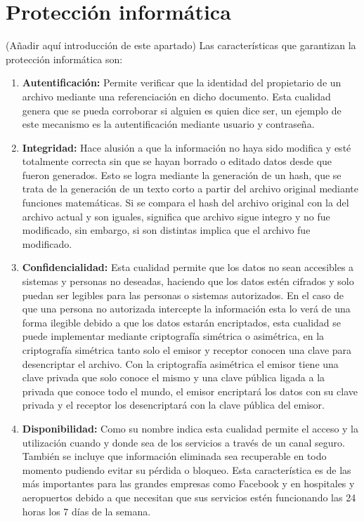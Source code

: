 \chapter{Protección informática}
\label{cha:proteccion-informatica}
(Añadir aquí introducción de este apartado)
Las características que garantizan la protección informática son:
\begin{enumerate}
\item {\bfseries Autentificación:}
Permite verificar que la identidad del propietario de un archivo mediante una referenciación en dicho documento. Esta cualidad genera que se pueda corroborar si alguien es quien dice ser, un ejemplo de este mecanismo es la autentificación mediante usuario y contraseña.
\item {\bfseries Integridad:}
Hace alusión a que la información no haya sido modifica y esté totalmente correcta sin que se hayan borrado o editado datos desde que fueron generados. Esto se logra mediante la generación de un hash, que se trata de la generación de un texto corto a partir del archivo original mediante funciones matemáticas. Si se compara el hash del archivo original con la del archivo actual y son iguales, significa que archivo sigue integro y no fue modificado, sin embargo, si son distintas implica que el archivo fue modificado.
\item {\bfseries Confidencialidad:}
Esta cualidad permite que los datos no sean accesibles a sistemas y personas no deseadas, haciendo que los datos estén cifrados y solo puedan ser legibles para las personas o sistemas autorizados. En el caso de que una persona no autorizada intercepte la información esta lo verá de una forma ilegible debido a que los datos estarán encriptados, esta cualidad se puede implementar mediante criptografía simétrica o asimétrica, en la criptografía simétrica tanto solo el emisor y receptor conocen una clave para desencriptar el archivo. Con la criptografía asimétrica el emisor tiene una clave privada que solo conoce el mismo y una clave pública ligada a la privada que conoce todo el mundo, el emisor encriptará los datos con su clave privada y el receptor los desencriptará con la clave pública del emisor.
\item {\bfseries Disponibilidad:}
Como su nombre indica esta cualidad permite el acceso y la utilización cuando y donde sea de los servicios a través de un canal seguro. También se incluye que información eliminada sea recuperable en todo momento pudiendo evitar su pérdida o bloqueo. Esta característica es de las más importantes para las grandes empresas como Facebook y en hospitales y aeropuertos debido a que necesitan que sus servicios estén funcionando las 24 horas los 7 días de la semana.

\end{enumerate}
